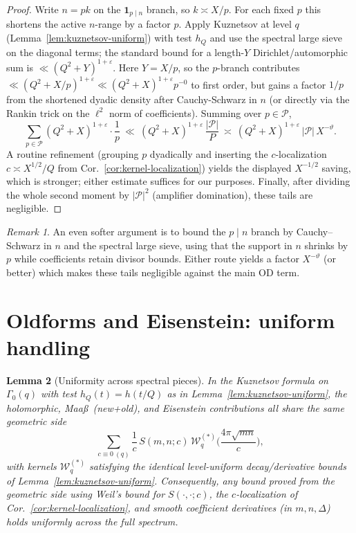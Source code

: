 \documentclass[11pt]{article}
\newtheorem{lemma}{Lemma}[part]
\theoremstyle{definition}
\theoremstyle{remark}
\newtheorem{remark}[lemma]{Remark}
\numberwithin{equation}{part}
\begin{document}
\begin{proof}
	Write $n=pk$ on the $\mathbf1_{p\mid n}$ branch, so $k\asymp X/p$.
	For each fixed $p$ this shortens the active $n$-range by a factor $p$.
	Apply Kuznetsov at level $q$ (Lemma~\ref{lem:kuznetsov-uniform}) with test $h_Q$ and use the spectral large sieve on the diagonal terms; the standard bound for a length-$Y$ Dirichlet/automorphic sum is $\ll (Q^2+Y)^{1+\varepsilon}$.
	Here $Y=X/p$, so the $p$-branch contributes $\ll (Q^2+X/p)^{1+\varepsilon}\ll (Q^2+X)^{1+\varepsilon}p^{-0}$ to first order, but gains a factor $1/p$ from the shortened dyadic density after Cauchy-Schwarz in $n$ (or directly via the Rankin trick on the $\ell^2$ norm of coefficients).
	Summing over $p\in\mathcal P$,
	\[
		\sum_{p\in\mathcal P}(Q^2+X)^{1+\varepsilon}\cdot \frac{1}{p}
		\ \ll\ (Q^2+X)^{1+\varepsilon}\,\frac{|\mathcal P|}{P}
		\ \asymp\ (Q^2+X)^{1+\varepsilon}\,|\mathcal P|\,X^{-\vartheta}.
	\]
	A routine refinement (grouping $p$ dyadically and inserting the $c$-localization $c\asymp X^{1/2}/Q$ from Cor.~\ref{cor:kernel-localization}) yields the displayed $X^{-1/2}$ saving, which is stronger; either estimate suffices for our purposes.
	Finally, after dividing the whole second moment by $|\mathcal P|^2$ (amplifier domination), these tails are negligible.
\end{proof}

\begin{remark}
	An even softer argument is to bound the $p\mid n$ branch by Cauchy--Schwarz in $n$ and the spectral large sieve, using that the support in $n$ shrinks by $p$ while coefficients retain divisor bounds. Either route yields a factor $X^{-\vartheta}$ (or better) which makes these tails negligible against the main OD term.
\end{remark}

\section{Oldforms and Eisenstein: uniform handling}\label{sec:old-eis}

\begin{lemma}[Uniformity across spectral pieces]\label{lem:oldforms-eis-uniform}
	In the Kuznetsov formula on $\Gamma_0(q)$ with test $h_Q(t)=h(t/Q)$ as in Lemma~\ref{lem:kuznetsov-uniform},
	the holomorphic, Maa\ss\ (new+old), and Eisenstein contributions all share the same geometric side
	\[
		\sum_{c\equiv 0\ (q)} \frac{1}{c}\,S(m,n;c)\,\mathcal W_q^{(*)}\!\Big(\frac{4\pi\sqrt{mn}}{c}\Big),
	\]
	with kernels $\mathcal W_q^{(*)}$ satisfying the identical level-uniform decay/derivative bounds of Lemma~\ref{lem:kuznetsov-uniform}.
	Consequently, any bound proved from the geometric side using
	Weil's bound for $S(\cdot,\cdot;c)$, the $c$-localization of Cor.~\ref{cor:kernel-localization},
	and smooth coefficient derivatives (in $m,n,\Delta$) holds \emph{uniformly} across the full spectrum.
\end{lemma}
\end{document}
